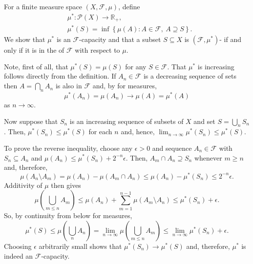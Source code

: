 \documentclass[12pt]{article}
\begin{document}

For a finite measure space $(X,\mathcal{F},\mu)$, define
\begin{align*}
&\mu^*\colon\mathcal{P}(X)\to\mathbb{R}_+,\\
&\mu^*(S)=\inf\left\{\mu(A)\colon A\in\mathcal{F},\ A\supseteq S\right\}.
\end{align*}
We show that $\mu^*$ is an $\mathcal{F}$-capacity and that a subset $S\subseteq X$ is $(\mathcal{F},\mu^*)$- if and only if it is in the  of $\mathcal{F}$ with respect to $\mu$.

Note, first of all, that $\mu^*(S)=\mu(S)$ for any $S\in\mathcal{F}$.
That $\mu^*$ is increasing follows directly from the definition. If $A_n\in\mathcal{F}$ is a decreasing sequence of sets then $A=\bigcap_nA_n$ is also in $\mathcal{F}$ and, by  for measures,
\begin{equation*}
\mu^*(A_n)=\mu(A_n)\rightarrow\mu(A)=\mu^*(A)
\end{equation*}
as $n\rightarrow\infty$.

Now suppose that $S_n$ is an increasing sequence of subsets of $X$ and set $S=\bigcup_nS_n$. Then, $\mu^*(S_n)\le\mu^*(S)$ for each $n$ and, hence, $\lim_{n\rightarrow\infty}\mu^*(S_n)\le\mu^*(S)$.

To prove the reverse inequality, choose any $\epsilon>0$ and sequence $A_n\in\mathcal{F}$ with $S_n\subseteq A_n$ and $\mu(A_n)\le\mu^*(S_n)+2^{-n}\epsilon$.
Then, $A_m\cap A_n\supseteq S_n$ whenever $m\ge n$ and, therefore,
\begin{equation*}
\mu(A_n\setminus A_m) = \mu(A_n)-\mu(A_m\cap A_n)\le\mu(A_n)-\mu^*(S_n)\le 2^{-n}\epsilon.
\end{equation*}
Additivity of $\mu$ then gives
\begin{equation*}
\mu\left(\bigcup_{m\le n}A_m\right)
\le\mu(A_n)+ \sum_{m=1}^{n-1}\mu(A_m\setminus A_n)\le\mu^*(S_n)+\epsilon.
\end{equation*}
So, by continuity from below for measures,
\begin{equation*}
\mu^*(S)\le\mu\left(\bigcup_nA_n\right)
=\lim_{n\rightarrow\infty}\mu\left(\bigcup_{m\le n}A_m\right)\le\lim_{n\rightarrow\infty}\mu^*(S_n)+\epsilon.
\end{equation*}
Choosing $\epsilon$ arbitrarily small shows that $\mu^*(S_n)\rightarrow\mu^*(S)$ and, therefore, $\mu^*$ is indeed an $\mathcal{F}$-capacity.
\end{document}
